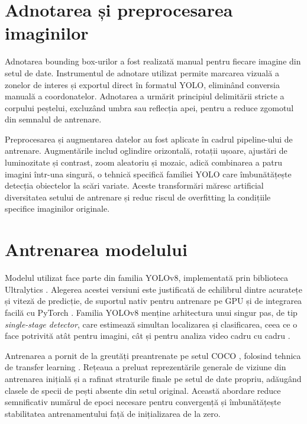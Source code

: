 \section{Adnotarea și preprocesarea imaginilor}

Adnotarea bounding box-urilor a fost realizată manual pentru fiecare imagine din setul de date. Instrumentul de adnotare utilizat permite marcarea vizuală a zonelor de interes și exportul direct în formatul YOLO, eliminând conversia manuală a coordonatelor. Adnotarea a urmărit principiul delimitării stricte a corpului peștelui, excluzând umbra sau reflecția apei, pentru a reduce zgomotul din semnalul de antrenare.

Preprocesarea și augmentarea datelor au fost aplicate în cadrul pipeline-ului de antrenare. Augmentările includ oglindire orizontală, rotații ușoare, ajustări de luminozitate și contrast, zoom aleatoriu și mozaic, adică combinarea a patru imagini într-una singură, o tehnică specifică familiei YOLO care îmbunătățește detecția obiectelor la scări variate. Aceste transformări măresc artificial diversitatea setului de antrenare și reduc riscul de overfitting la condițiile specifice imaginilor originale.

\section{Antrenarea modelului}

Modelul utilizat face parte din familia YOLOv8, implementată prin biblioteca Ultralytics \citep{ultralytics}. Alegerea acestei versiuni este justificată de echilibrul dintre acuratețe și viteză de predicție, de suportul nativ pentru antrenare pe GPU și de integrarea facilă cu PyTorch \citep{pytorch}. Familia YOLOv8 menține arhitectura unui singur pas, de tip \emph{single-stage detector}, care estimează simultan localizarea și clasificarea, ceea ce o face potrivită atât pentru imagini, cât și pentru analiza video cadru cu cadru \citep{redmon2016yolo}.

Antrenarea a pornit de la greutăți preantrenate pe setul COCO \citep{lin2014coco}, folosind tehnica de transfer learning \citep{goodfellow2016,bishop2006}. Rețeaua a preluat reprezentările generale de viziune din antrenarea inițială și a rafinat straturile finale pe setul de date propriu, adăugând clasele de specii de pești absente din setul original. Această abordare reduce semnificativ numărul de epoci necesare pentru convergență și îmbunătățește stabilitatea antrenamentului față de inițializarea de la zero.

